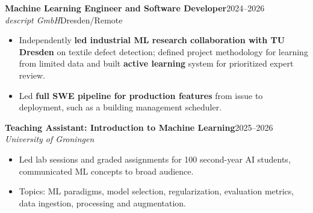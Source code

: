 \documentclass[10pt,a4paper]{article}
\newcommand{\cvheading}[4]{\textbf{#1}\hfill #2\\\emph{#3}\hfill #4\par}
\begin{document}
\cvheading{Machine Learning Engineer and Software Developer}{2024--2026}{descript GmbH}{Dresden/Remote}
\begin{itemize}
    \item Independently \textbf{led industrial ML research collaboration with TU Dresden} on textile defect detection; defined project methodology for learning from limited data and built \textbf{active learning} system for prioritized expert review.
    \item Led \textbf{full SWE pipeline for production features} from issue to deployment, such as a building management scheduler.
\end{itemize}
\cvheading{Teaching Assistant: Introduction to Machine Learning}{2025--2026}{University of Groningen}{}
\begin{itemize}
    \item Led lab sessions and graded assignments for 100 second-year AI students, communicated ML concepts to broad audience.
    \item Topics: ML paradigms, model selection, regularization, evaluation metrics, data ingestion, processing and augmentation.
\end{itemize}
\end{document}
